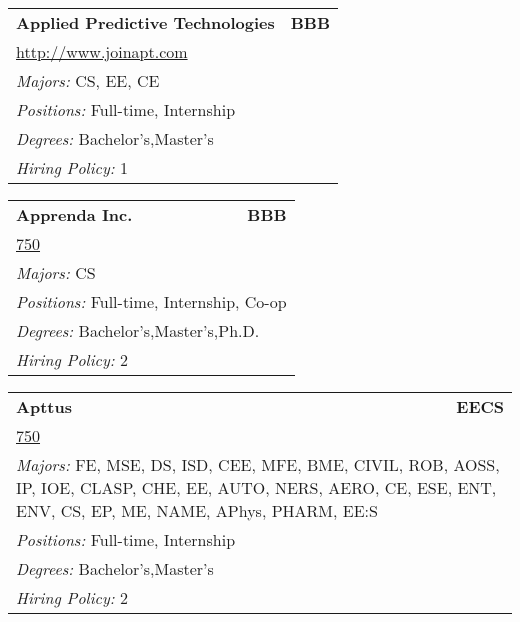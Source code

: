 \documentclass[twoside]{article}
\begin{document}
\begin{center}
\begin{multicols}{3}
\begin{FlushLeft}
\begin{minipage}{.9\columnwidth}
\end{minipage}
 
\begin{minipage}{.9\columnwidth}\begin{tabularx}{.95\columnwidth}{Xr}
                 {\Large\bf Applied Predictive Technologies} & {\Large\bf BBB}\\
    \multicolumn{2}{p{.95\columnwidth}}{\url{http://www.joinapt.com}}\\
    \multicolumn{2}{p{.95\columnwidth}}{\emph{Majors:} CS, EE, CE}\\
    \multicolumn{2}{p{.95\columnwidth}}{\emph{Positions:} Full-time, Internship}\\
    \multicolumn{2}{p{.95\columnwidth}}{\emph{Degrees:} Bachelor's,Master's}\\
    \multicolumn{2}{p{.95\columnwidth}}{\emph{Hiring Policy:} 1}\\
    \end{tabularx}
    
\end{minipage}
 
\begin{minipage}{.9\columnwidth}\begin{tabularx}{.95\columnwidth}{Xr}
                 {\Large\bf Apprenda Inc.} & {\Large\bf BBB}\\
    \multicolumn{2}{p{.95\columnwidth}}{\url{750}}\\
    \multicolumn{2}{p{.95\columnwidth}}{\emph{Majors:} CS}\\
    \multicolumn{2}{p{.95\columnwidth}}{\emph{Positions:} Full-time, Internship, Co-op}\\
    \multicolumn{2}{p{.95\columnwidth}}{\emph{Degrees:} Bachelor's,Master's,Ph.D.}\\
    \multicolumn{2}{p{.95\columnwidth}}{\emph{Hiring Policy:} 2}\\
    \end{tabularx}
    
\end{minipage}
 
\begin{minipage}{.9\columnwidth}\begin{tabularx}{.95\columnwidth}{Xr}
                 {\Large\bf Apttus} & {\Large\bf EECS}\\
    \multicolumn{2}{p{.95\columnwidth}}{\url{750}}\\
    \multicolumn{2}{p{.95\columnwidth}}{\emph{Majors:} FE, MSE, DS, ISD, CEE, MFE, BME, CIVIL, ROB, AOSS, IP, IOE, CLASP, CHE, EE, AUTO, NERS, AERO, CE, ESE, ENT, ENV, CS, EP, ME, NAME, APhys, PHARM, EE:S}\\
    \multicolumn{2}{p{.95\columnwidth}}{\emph{Positions:} Full-time, Internship}\\
    \multicolumn{2}{p{.95\columnwidth}}{\emph{Degrees:} Bachelor's,Master's}\\
    \multicolumn{2}{p{.95\columnwidth}}{\emph{Hiring Policy:} 2}\\
    \end{tabularx}
    

\end{minipage}
\end{FlushLeft}
\end{multicols}
\end{center}
\end{document}
